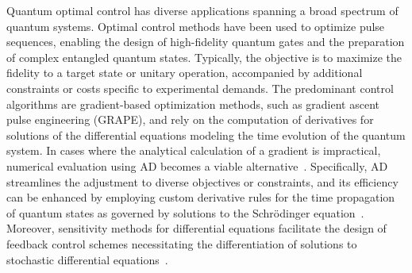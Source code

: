 Quantum optimal control has diverse applications spanning a broad spectrum of quantum systems. 
Optimal control methods have been used to optimize pulse sequences, enabling the design of high-fidelity quantum gates and the preparation of complex entangled quantum states. 
Typically, the objective is to maximize the fidelity to a target state or unitary operation, accompanied by additional constraints or costs specific to experimental demands. 
The predominant control algorithms are gradient-based optimization methods, such as gradient ascent pulse engineering (GRAPE), and rely on the computation of derivatives for solutions of the differential equations modeling the time evolution of the quantum system. 
In cases where the analytical calculation of a gradient is impractical, numerical evaluation using AD becomes a viable alternative~\cite{jirari:2009, leung:2017, abdelhafez:2019, jirari2019quantum, abdelhafez:2020, schaefer:2020, goerz:2022}. 
Specifically, AD streamlines the adjustment to diverse objectives or constraints, and its efficiency can be enhanced by employing custom derivative rules for the time propagation of quantum states as governed by solutions to the Schrödinger equation~\cite{goerz:2022}. 
Moreover, sensitivity methods for differential equations facilitate the design of feedback control schemes necessitating the differentiation of solutions to stochastic differential equations~\cite{schaefer:2021}.
